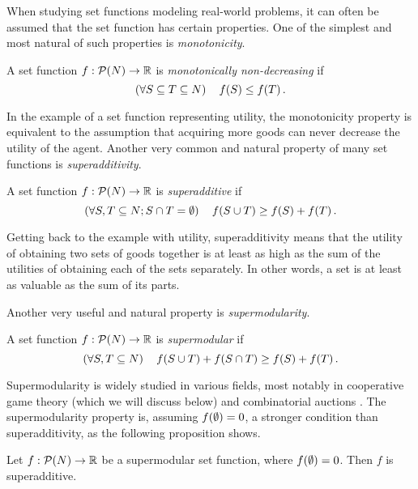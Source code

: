 When studying set functions modeling real-world problems, it can often be assumed that the set function has certain properties.
One of the simplest and most natural of such properties is \emph{monotonicity}.

\begin{defi}[Monotonicity]
	A set function $ f: \mathcal{P}\!\left(N\right) \to \mathbb{R} $ is \emph{monotonically non-decreasing} if \[
		\left( \forall S \subseteq T \subseteq N \right)\quad f\!\left(S\right) \leq f\!\left(T\right).
	\]
\end{defi}

In the example of a set function representing utility, the monotonicity property is equivalent to the assumption that acquiring more goods can never decrease the utility of the agent.
Another very common and natural property of many set functions is \emph{superadditivity}.

\begin{defi}[Superadditivity]
	A set function $ f: \mathcal{P}\!\left(N\right) \to \mathbb{R} $ is \emph{superadditive} if \[
		\left( \forall S, T \subseteq N; S \cap T = \emptyset \right)\quad f\!\left(S \cup T\right) \geq f\!\left(S\right) + f\!\left(T\right).
	\]
\end{defi}

Getting back to the example with utility, superadditivity means that the utility of obtaining two sets of goods together is at least as high as the sum of the utilities of obtaining each of the sets separately.
In other words, a set is at least as valuable as the sum of its parts.

Another very useful and natural property is \emph{supermodularity}.

\begin{defi}[Supermodularity]
	A set function $ f: \mathcal{P}\!\left(N\right) \to \mathbb{R} $ is \emph{supermodular} if \[
		\left( \forall S, T \subseteq N \right)\quad f\!\left(S \cup T\right) + f\!\left(S \cap T\right) \geq f\!\left(S\right) + f\!\left(T\right).
	\]
\end{defi}

Supermodularity is widely studied in various fields, most notably in cooperative game theory (which we will discuss below) and combinatorial auctions \citep{grabisch2016set,doi:10.1287/ijoc.15.3.284.16077}.
The supermodularity property is, assuming $ f\!\left(\emptyset\right) = 0 $, a stronger condition than superadditivity, as the following proposition shows.

\begin{prop}[ ]
	Let $ f: \mathcal{P}\!\left(N\right) \to \mathbb{R} $ be a supermodular set function, where $ f\!\left(\emptyset\right) = 0 $.
	Then $ f $ is superadditive.
\end{prop}

